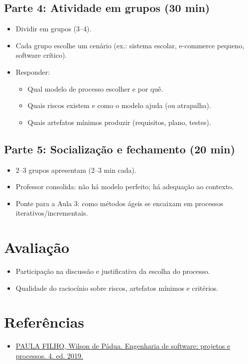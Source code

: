 \documentclass[12pt,a4paper]{article}
\begin{document}
\subsection*{Parte 4: Atividade em grupos (30 min)}
\begin{itemize}[leftmargin=*,itemsep=0.35em]
  \item Dividir em grupos (3--4).
  \item Cada grupo escolhe um cenário (ex.: sistema escolar, e-commerce pequeno, software crítico).
  \item Responder:
  \begin{itemize}[leftmargin=*,itemsep=0.25em]
    \item Qual modelo de processo escolher e por quê.
    \item Quais riscos existem e como o modelo ajuda (ou atrapalha).
    \item Quais artefatos mínimos produzir (requisitos, plano, testes).
  \end{itemize}
\end{itemize}

\subsection*{Parte 5: Socialização e fechamento (20 min)}
\begin{itemize}[leftmargin=*,itemsep=0.35em]
  \item 2--3 grupos apresentam (2--3 min cada).
  \item Professor consolida: não há modelo perfeito; há adequação ao contexto.
  \item Ponte para a Aula 3: como métodos ágeis se encaixam em processos iterativos/incrementais.
\end{itemize}

\section{Avaliação}
\begin{itemize}[leftmargin=*,itemsep=0.25em]
  \item Participação na discussão e justificativa da escolha do processo.
  \item Qualidade do raciocínio sobre riscos, artefatos mínimos e critérios.
\end{itemize}

\section{Referências}
\begin{itemize}[leftmargin=*,itemsep=0.25em]
  \item \href{../99-Materiais/Engenharia%20de%20software%20projetos%20e%20processos%20by%20Wilson%20de%20P%C3%A1dua%20Paula%20Filho%20.epub.pdf}{PAULA FILHO, Wilson de Pádua. Engenharia de software: projetos e processos. 4. ed. 2019.}
\end{itemize}
\end{document}
